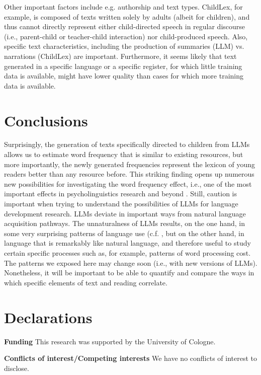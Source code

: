 \documentclass[jou, a4paper]{apa7}
\begin{document}
Other important factors include e.g. authorship and text types. ChildLex, for example, is composed of texts written solely by adults (albeit for children), and thus cannot directly represent either child-directed speech in regular discourse (i.e., parent-child or teacher-child interaction) nor child-produced speech. Also, specific text characteristics, including the production of summaries (LLM) vs. narrations (ChildLex) are important. Furthermore, it seems likely that text generated in a specific language or a specific register, for which little training data is available, might have lower quality than cases for which more training data is available. 

\section*{Conclusions}

Surprisingly, the generation of texts specifically directed to children from LLMs allows us to estimate word frequency that is similar to existing resources, but more importantly, the newly generated frequencies represent the lexicon of young readers better than any resource before. This striking finding opens up numerous new possibilities for investigating the word frequency effect, i.e., one of the most important effects in psycholinguistics research \citep{brysbaert_word_2018} and beyond \citep{gregorova_access_2023}. Still, caution is important when trying to understand the possibilities of LLMs for language development research. LLMs deviate in important ways from natural language acquisition pathways. The unnaturalness of LLMs results, on the one hand, in some very surprising patterns of language use (c.f. \citep{vanmassenhove_machine_2021}, but on the other hand, in language that is remarkably like natural language, and therefore useful to study certain specific processes such as, for example, patterns of word processing cost. The patterns we exposed here may change soon (i.e., with new versions of LLMs). Nonetheless, it will be important to be able to quantify and compare the ways in which specific elements of text and reading correlate.  

\section*{Declarations}

\textbf{Funding} This research was supported by the University of Cologne. 

\textbf{Conflicts of interest/Competing interests} We have no conflicts of interest to disclose. 
\end{document}
